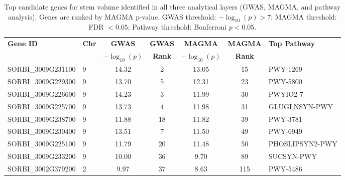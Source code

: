 \documentclass[11pt]{article}
\begin{document}
\begin{table}[htbp]
\centering
\caption{Top candidate genes for stem volume identified in all three analytical layers (GWAS, MAGMA, and pathway analysis). Genes are ranked by MAGMA p-value. GWAS threshold: $-\log_{10}(p) > 7$; MAGMA threshold: FDR $< 0.05$; Pathway threshold: Bonferroni $p < 0.05$.}
\label{tab:top_genes}
\small
\begin{tabular}{@{}llccccl@{}}
\toprule
\textbf{Gene ID} & \textbf{Chr} & \textbf{GWAS} & \textbf{GWAS} & \textbf{MAGMA} & \textbf{MAGMA} & \textbf{Top Pathway} \\
 & & $-\log_{10}(p)$ & \textbf{Rank} & $-\log_{10}(p)$ & \textbf{Rank} & \\
\midrule
SORBI\_3009G231100 & 9 & 14.32 & 2 & 13.05 & 15 & PWY-1269 \\
SORBI\_3009G229300 & 9 & 13.70 & 5 & 12.31 & 23 & PWY-5800 \\
SORBI\_3009G226600 & 9 & 14.23 & 3 & 11.99 & 30 & PWYIO2-7 \\
SORBI\_3009G225700 & 9 & 13.73 & 4 & 11.98 & 31 & GLUGLNSYN-PWY \\
SORBI\_3009G238700 & 9 & 11.88 & 18 & 11.82 & 39 & PWY-3781 \\
SORBI\_3009G230400 & 9 & 13.51 & 7 & 11.50 & 49 & PWY-6949 \\
SORBI\_3009G225100 & 9 & 11.79 & 20 & 11.48 & 50 & PHOSLIPSYN2-PWY \\
SORBI\_3009G233200 & 9 & 10.00 & 36 & 9.70 & 89 & SUCSYN-PWY \\
SORBI\_3002G379200 & 2 & 9.97 & 37 & 8.63 & 115 & PWY-5486 \\
\bottomrule
\end{tabular}
\end{table}
\end{document}
